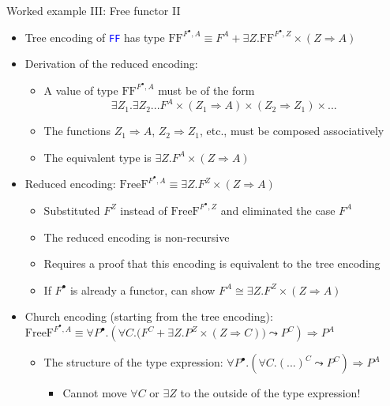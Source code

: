 \documentclass[english,,russian]{beamer}
\begin{document}
\begin{frame}{Worked example III: Free functor II}
\begin{itemize}
\item Tree encoding of \texttt{\textcolor{blue}{\footnotesize{}FF}} has
type $\text{FF}^{F^{\bullet},A}\equiv F^{A}+\exists Z.\text{FF}^{F^{\bullet},Z}\times\left(Z\Rightarrow A\right)$
\item Derivation of the reduced encoding:
\begin{itemize}
\item A value of type $\text{FF}^{F^{\bullet},A}$ must be of the form 
\[
\exists Z_{1}.\exists Z_{2}...F^{A}\times\left(Z_{1}\Rightarrow A\right)\times\left(Z_{2}\Rightarrow Z_{1}\right)\times...
\]
\item The functions $Z_{1}\Rightarrow A$, $Z_{2}\Rightarrow Z_{1}$, etc.,
must be composed associatively
\item The equivalent type is $\exists Z.F^{A}\times\left(Z\Rightarrow A\right)$
\end{itemize}
\item Reduced encoding: $\text{FreeF}^{F^{\bullet},A}\equiv\exists Z.F^{Z}\times\left(Z\Rightarrow A\right)$
\begin{itemize}
\item Substituted $F^{Z}$ instead of $\text{FreeF}^{F^{\bullet},Z}$ and
eliminated the case $F^{A}$
\item The reduced encoding is non-recursive
\item Requires a proof that this encoding is equivalent to the tree encoding
\item If $F^{\bullet}$ is already a functor, can show $F^{A}\cong\exists Z.F^{Z}\times\left(Z\Rightarrow A\right)$
\end{itemize}
\item Church encoding (starting from the tree encoding): $\text{FreeF}^{F^{\bullet},A}\equiv\forall P^{\bullet}.\left(\forall C.\big(F^{C}+\exists Z.P^{Z}\times\left(Z\Rightarrow C\right)\big)\leadsto P^{C}\right)\Rightarrow P^{A}$
\begin{itemize}
\item The structure of the type expression: $\forall P^{\bullet}.\left(\forall C.(...)^{C}\leadsto P^{C}\right)\Rightarrow P^{A}$
\begin{itemize}
\item Cannot move $\forall C$ or $\exists Z$ to the outside of the type
expression!
\end{itemize}
\end{itemize}
\end{itemize}
\end{frame}
\end{document}
